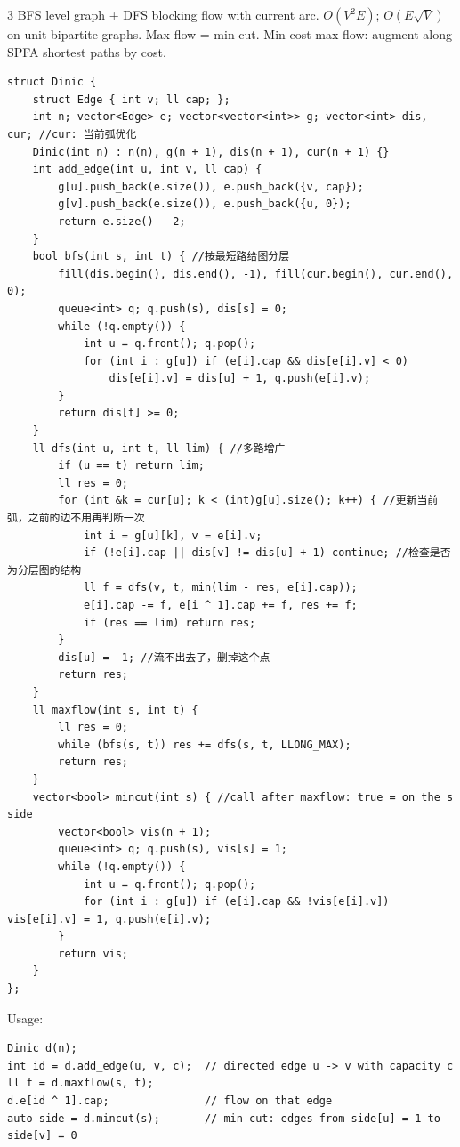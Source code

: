 \documentclass[8pt]{extarticle}
\begin{document}
\begin{multicols*}{3}
BFS level graph + DFS blocking flow with current arc. $O(V^2E)$; $O(E\sqrt V)$ on unit bipartite graphs. Max flow = min cut. Min-cost max-flow: augment along SPFA shortest paths by cost.

\begin{lstlisting}
struct Dinic {
    struct Edge { int v; ll cap; };
    int n; vector<Edge> e; vector<vector<int>> g; vector<int> dis, cur; //cur: 当前弧优化
    Dinic(int n) : n(n), g(n + 1), dis(n + 1), cur(n + 1) {}
    int add_edge(int u, int v, ll cap) {
        g[u].push_back(e.size()), e.push_back({v, cap});
        g[v].push_back(e.size()), e.push_back({u, 0});
        return e.size() - 2;
    }
    bool bfs(int s, int t) { //按最短路给图分层
        fill(dis.begin(), dis.end(), -1), fill(cur.begin(), cur.end(), 0);
        queue<int> q; q.push(s), dis[s] = 0;
        while (!q.empty()) {
            int u = q.front(); q.pop();
            for (int i : g[u]) if (e[i].cap && dis[e[i].v] < 0)
                dis[e[i].v] = dis[u] + 1, q.push(e[i].v);
        }
        return dis[t] >= 0;
    }
    ll dfs(int u, int t, ll lim) { //多路增广
        if (u == t) return lim;
        ll res = 0;
        for (int &k = cur[u]; k < (int)g[u].size(); k++) { //更新当前弧，之前的边不用再判断一次
            int i = g[u][k], v = e[i].v;
            if (!e[i].cap || dis[v] != dis[u] + 1) continue; //检查是否为分层图的结构
            ll f = dfs(v, t, min(lim - res, e[i].cap));
            e[i].cap -= f, e[i ^ 1].cap += f, res += f;
            if (res == lim) return res;
        }
        dis[u] = -1; //流不出去了，删掉这个点
        return res;
    }
    ll maxflow(int s, int t) {
        ll res = 0;
        while (bfs(s, t)) res += dfs(s, t, LLONG_MAX);
        return res;
    }
    vector<bool> mincut(int s) { //call after maxflow: true = on the s side
        vector<bool> vis(n + 1);
        queue<int> q; q.push(s), vis[s] = 1;
        while (!q.empty()) {
            int u = q.front(); q.pop();
            for (int i : g[u]) if (e[i].cap && !vis[e[i].v]) vis[e[i].v] = 1, q.push(e[i].v);
        }
        return vis;
    }
};
\end{lstlisting}

Usage:

\begin{lstlisting}
Dinic d(n);
int id = d.add_edge(u, v, c);  // directed edge u -> v with capacity c
ll f = d.maxflow(s, t);
d.e[id ^ 1].cap;               // flow on that edge
auto side = d.mincut(s);       // min cut: edges from side[u] = 1 to side[v] = 0


\end{lstlisting}
\end{multicols*}
\end{document}
